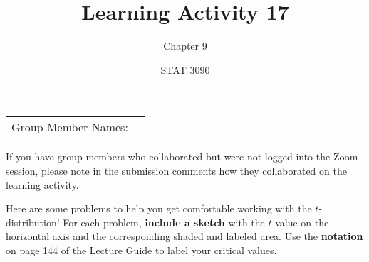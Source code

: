 \documentclass[noanswers]{exam}
\title{Learning Activity 17}
\author{Chapter 9}
\date{STAT 3090}
\begin{document}
\noindent\begin{tabular}{@{}p{1.4in}p{5.2in}@{}}
Group Member Names: & \hrulefill
\end{tabular}

\vspace{1mm}
\noindent If you have group members who collaborated but were not logged into the Zoom session, please note in the submission comments how they collaborated on the learning activity.

\vspace{5mm}

\noindent Here are some problems to help you get comfortable working with the $t$-distribution! For each problem, \textbf{include a sketch} with the $t$ value on the horizontal axis and the corresponding shaded and labeled area. Use the \textbf{notation} on page 144 of the Lecture Guide to label your critical values.

\vspace{3mm}
\end{document}
